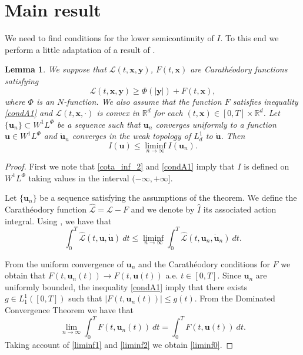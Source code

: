 \documentclass[twoside]{article}
\newtheorem{lem}[thm]{Lemma}
\theoremstyle{remark}
\newcommand{\lphi}{L^{\Phi}}
\newcommand{\wphi}{W^{1}\lphi}
\renewcommand{\b}[1]{\boldsymbol{#1}}
\newcommand{\rr}{\mathbb{R}}
\renewcommand{\leq}{\leqslant}
\begin{document}
\section{Main result}\label{sec:main}



We need to find conditions for the lower semicontinuity of  $I$. To this end we perform a little adaptation of  a result of \cite{ekeland1999convex}. 


\begin{lem}\label{semicontinf}
We suppose that $\mathcal{L}(t,\b{x},\b{y})$, $F(t,\b{x})$ are Carath\'eodory functions satisfying
\begin{equation}\label{cota_inf_2}
\mathcal{L}(t,\b{x},\b{y})\geq \Phi\left(|\b{y}|\right)+ F(t,\b{x}),
\end{equation}
where $\Phi$ is an $N$-function. 
We also assume that the function $F$ satisfies inequality \eqref{condA1} and $\mathcal{L}(t,\b{x},\cdot)$ is convex in $\rr^d$ for each $(t,\b{x})\in [0,T]\times\rr^d$.  Let $\{\b{u}_n\}\subset\wphi$ be a sequence such that $\b{u}_n$ converges  uniformly  to a function $\b{u}\in\wphi$ and $\b{\dot{u}}_n$ converges in the weak topology of $L^1_d$ to $\b{\dot{u}}$.   Then
\begin{equation}\label{liminf0}I(\b{u})\leq \liminf_{n\to\infty}I(\b{u}_n).
\end{equation}

\end{lem}

\begin{proof} First we note that \eqref{cota_inf_2} and \eqref{condA1} imply that $I$ is defined on $\wphi$ taking values in the interval $(-\infty,+\infty]$. 

Let $\{\b{u}_n\}$ be a sequence  satisfying the assumptions of the theorem.   We define the Carath\'eodory function $\mathcal{\hat{L}}=\mathcal{L}-F$ and we denote by $\hat{I}$ its  associated action integral. Using  \cite[Thm. 2.1, p. 243]{ekeland1999convex}, we have that
\begin{equation}\label{liminf1}
\int_0^T\mathcal{\hat{L}}(t,\b{u},\b{\dot{u}})\ dt\leq \liminf_{n\to\infty}\int_0^T\mathcal{\hat{L}}(t,\b{u}_n,\b{\dot{u}}_n)\ dt.
\end{equation}

From the uniform convergence of $\b{u}_n$ and the Carath\'eodory conditions for $F$ we obtain that $F(t,\b{u}_n(t))\to F(t,\b{u}(t))$ a.e. $t\in[0,T]$.  Since $\b{u}_n$ are uniformly bounded, the inequality  \eqref{condA1} imply that there exists $g\in L_1^1([0,T])$ such that $|F(t,\b{u}_n(t))|\leq g(t)$. From the Dominated Convergence Theorem we have that 
\begin{equation}\label{liminf2}
\lim_{n\to\infty}\int_0^TF(t,\b{u}_n(t))\ dt=\int_0^TF(t,\b{u}(t))\ dt.
\end{equation}
Taking account of \eqref{liminf1} and  \eqref{liminf2} we obtain \eqref{liminf0}.

\end{proof}
\end{document}

